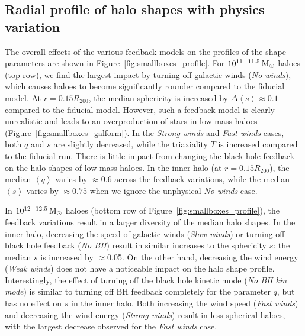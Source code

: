 \documentclass[fleqn,usenatbib]{mnras}
\def\msun{\,\rm M_{\odot}}
\begin{document}

\subsection{Radial profile of halo shapes with physics variation}

The overall effects of the various feedback models on the profiles of the shape parameters are shown in Figure~\ref{fig:smallboxes_profile}.
For $10^{11-11.5} \msun$ haloes (top row), we find the largest impact by turning off galactic winds (\emph{No winds}), which causes haloes to become significantly rounder compared to the fiducial model.
At $r = 0.15 R_{200}$, the median sphericity is increased by $\Delta \left<s\right> \approx 0.1$ compared to the fiducial model. 
However, such a feedback model is clearly unrealistic and leads to an overproduction of stars in low-mass haloes (Figure~\ref{fig:smallboxes_galform}).
In the \emph{Strong winds} and \emph{Fast winds} cases, both $q$ and $s$ are slightly decreased, while the triaxiality $T$ is increased compared to the fiducial run.
There is little impact from changing the black hole feedback on the halo shapes of low mass haloes.
In the inner halo (at $r=0.15R_{200}$),  the median $\left<q\right>$ varies by $\approx $0.6 across the feedback variations, while the median $\left<s\right>$ varies by $\approx 0.75$ when we ignore the unphysical \emph{No winds} case.

In $10^{12-12.5} \msun$ haloes (bottom row of Figure~\ref{fig:smallboxes_profile}), the feedback variations result in a larger diversity of the median halo shapes.
In the inner halo, decreasing the speed of galactic winds (\emph{Slow winds}) or turning off black hole feedback (\emph{No BH}) result in similar increases to the sphericity $s$: the median $s$ is increased by ${\approx}$0.05.
On the other hand, decreasing the wind energy (\emph{Weak winds}) does not have a noticeable impact on the halo shape profile.
Interestingly, the effect of turning off the black hole kinetic mode (\emph{No BH kin mode}) is similar to turning off BH feedback completely for the parameter $q$, but has no effect on $s$ in the inner halo.
Both increasing the wind speed (\emph{Fast winds}) and decreasing the wind energy (\emph{Strong winds}) result in less spherical haloes, with the largest decrease observed for the \emph{Fast winds} case.
\end{document}
